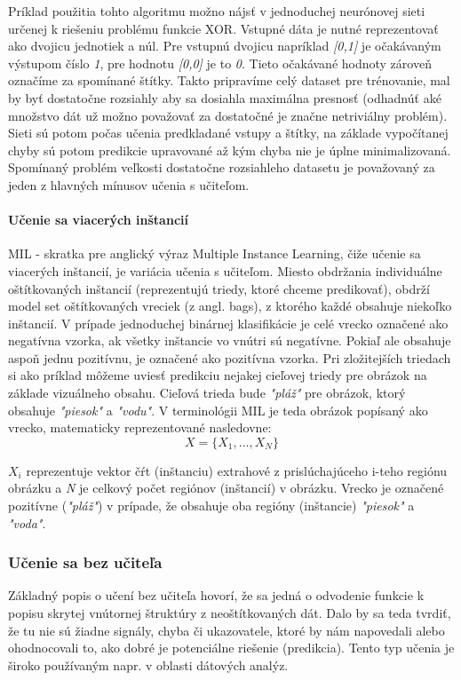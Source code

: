 Príklad použitia tohto algoritmu možno nájsť v jednoduchej neurónovej sieti určenej k riešeniu problému funkcie XOR\cite{neuron}. Vstupné dáta je nutné reprezentovať ako dvojicu jednotiek a núl. Pre vstupnú dvojicu napríklad \textit{[0,1]} je očakávaným výstupom číslo \textit{1}, pre hodnotu \textit{[0,0]} je to \textit{0}. Tieto očakávané hodnoty zároveň označíme za spomínané štítky. Takto pripravíme celý dataset pre trénovanie, mal by byť dostatočne rozsiahly aby sa dosiahla maximálna presnosť (odhadnúť aké množstvo dát už možno považovať za dostatočné je značne netriviálny problém). Sieti sú potom počas učenia predkladané vstupy a štítky, na základe vypočítanej chyby sú potom predikcie upravované až kým chyba nie je úplne minimalizovaná. Spomínaný problém veľkosti dostatočne rozsiahleho datasetu je považovaný za jeden z hlavných mínusov učenia s učiteľom.

	
\paragraph{Učenie sa viacerých inštancií}

MIL\cite{minhas2012multiple} - skratka pre anglický výraz Multiple Instance Learning, čiže učenie sa viacerých inštancií, je variácia učenia s učiteľom. Miesto obdržania individuálne oštítkovaných inštancií (reprezentujú triedy, ktoré chceme predikovať),  obdrží model set oštítkovaných vreciek (z angl. bags), z ktorého každé obsahuje niekoľko inštancií. V prípade jednoduchej binárnej klasifikácie je celé vrecko označené ako negatívna vzorka, ak všetky inštancie vo vnútri sú negatívne. Pokiaľ ale obsahuje aspoň jednu pozitívnu, je označené ako pozitívna vzorka. Pri zložitejších triedach si ako príklad môžeme uviesť predikciu nejakej cieľovej triedy pre obrázok na základe vizuálneho obsahu. Cieľová trieda bude \textit{"pláž"} pre obrázok, ktorý obsahuje  \textit{"piesok"} a \textit{"vodu"}. V terminológii MIL je teda obrázok popísaný ako vrecko, matematicky reprezentované nasledovne:
	\begin{equation}
		X = \{X_1, ..., X_N\}
	\end{equation}

$X_{i}$ reprezentuje vektor čŕt (inštanciu) extrahové z prislúchajúceho i-teho regiónu obrázku a \textit{N} je celkový počet regiónov (inštancií) v obrázku. Vrecko je označené pozitívne  (\textit{"pláž"})  v prípade, že obsahuje oba regióny (inštancie) \textit{"piesok"} a \textit{"voda"}.

\subsubsection{Učenie sa bez učiteľa}
Základný popis o učení bez učiteľa hovorí, že sa jedná o odvodenie funkcie k popisu skrytej vnútornej štruktúry z neoštítkovaných dát. Dalo by sa teda tvrdiť, že tu nie sú žiadne signály, chyba či ukazovatele, ktoré by nám napovedali alebo ohodnocovali to, ako dobré je potenciálne riešenie (predikcia). Tento typ učenia je široko používaným napr. v oblasti dátových analýz.

